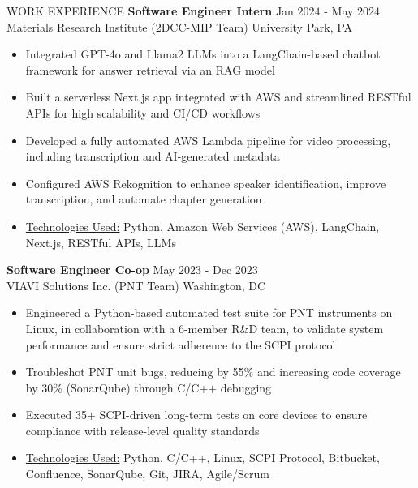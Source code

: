 \documentclass{resume} %
\begin{document}
\begin{rSection}{WORK EXPERIENCE}
{\bf Software Engineer Intern} \hfill Jan $2024$ - May $2024$\\
Materials Research Institute (2DCC-MIP Team) \hfill University Park, PA
\begin{itemize}[itemsep = -4pt]
    \item Integrated GPT-4o and Llama2 LLMs into a LangChain-based chatbot framework for answer retrieval via an RAG model 
    \item Built a serverless Next.js app integrated with AWS and streamlined RESTful APIs for high scalability and CI/CD workflows
    \item Developed a fully automated AWS Lambda pipeline for video processing, including transcription and AI-generated metadata
    \item Configured AWS Rekognition to enhance speaker identification, improve transcription, and automate chapter generation
    \item \underline{Technologies Used:} Python, Amazon Web Services (AWS), LangChain, Next.js, RESTful APIs, LLMs
\end{itemize}

{\bf Software Engineer Co-op} \hfill May $2023$ - Dec $2023$\\
VIAVI Solutions Inc. (PNT Team) \hfill Washington, DC
\begin{itemize}[itemsep = -4pt]
    \item Engineered a Python-based automated test suite for PNT instruments on Linux, in collaboration with a 6-member R\&D team, to validate system performance and ensure strict adherence to the SCPI protocol
    \item Troubleshot PNT unit bugs, reducing by 55\% and increasing code coverage by 30\% (SonarQube) through C/C++ debugging
    \item Executed 35+ SCPI-driven long-term tests on core devices to ensure compliance with release-level quality standards
    \item \underline{Technologies Used:} Python, C/C++, Linux, SCPI Protocol, Bitbucket, Confluence, SonarQube, Git, JIRA, Agile/Scrum
\end{itemize}


\end{rSection}
\end{document}
